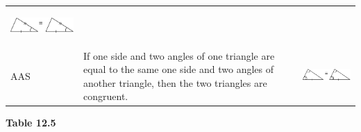 \begin{center}
\begin{xtabular*}{\mytablewidth}[t]{|p{10\mystarwidth}|p{10\mystarwidth}|p{10\mystarwidth}|}
    \setcounter{subfigure}{0}
\label{m39368*id318143}
    \begin{center}
    \label{m39368*id318143!!!underscore!!!media}\label{m39368*id318143!!!underscore!!!printimage}\includegraphics{col11306.imgs/m39368_MG10C13_033.png} %
      \vspace{2pt}
    \vspace{.1in}
    \end{center}    
     \tabularnewline{}
        AAS &
        If one side and two angles of one triangle are equal to the same one side and two angles of another triangle, then the two triangles are congruent. &
    \setcounter{subfigure}{0}
\label{m39368*id318178}
    \begin{center}
    \label{m39368*id318178!!!underscore!!!media}\label{m39368*id318178!!!underscore!!!printimage}\includegraphics{col11306.imgs/m39368_MG10C13_034.png} %
      \vspace{2pt}
    \vspace{.1in}
    \end{center}    
     \tabularnewline{}
    \end{xtabular*}
      \end{center}
    \begin{center}{\small\bfseries Table 12.5}\end{center}
    \par
        \label{m39368*uid48}
